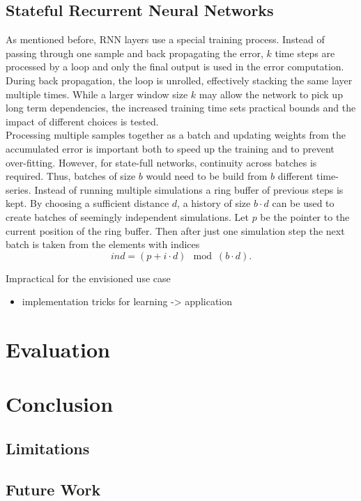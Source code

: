 \documentclass[sigconf]{acmart}
\begin{document}
\subsection{Stateful Recurrent Neural Networks}
As mentioned before, RNN layers use a special training process. Instead of passing through one sample and back propagating the error, $k$ time steps are processed by a loop and only the final output is used in the error computation. During back propagation, the loop is unrolled, effectively stacking the same layer multiple times. 
While a larger window size $k$ may allow the network to pick up long term dependencies, the increased training time sets practical bounds and the impact of different choices is tested.\\
Processing multiple samples together as a batch and updating weights from the accumulated error is important both to speed up the training and to prevent over-fitting. However, for state-full networks, continuity across batches is required. Thus, batches of size $b$ would need to be build from $b$ different time-series. Instead of running multiple simulations a ring buffer of previous steps is kept. By choosing a sufficient distance $d$, a history of size $b \cdot d$ can be used to create batches of seemingly independent simulations. Let $p$ be the pointer to the current position of the ring buffer. Then after just one simulation step the next batch is taken from the elements with indices
\[
ind = (p + i \cdot d) \mod (b \cdot d).
\]

Impractical for the envisioned use case
\begin{itemize}
	\item implementation tricks for learning -> application
\end{itemize}
\section{Evaluation}
\section{Conclusion}
\subsection{Limitations}
\subsection{Future Work}


%

\end{document}
